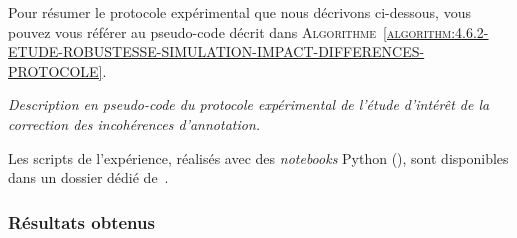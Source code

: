 			Pour résumer le protocole expérimental que nous décrivons ci-dessous, vous pouvez vous référer au pseudo-code décrit dans \textsc{Algorithme~\ref{algorithm:4.6.2-ETUDE-ROBUSTESSE-SIMULATION-IMPACT-DIFFERENCES-PROTOCOLE}}.
			
			\begin{algorithm}
				\caption{\textit{
					Description en pseudo-code du protocole expérimental de l'étude d'intérêt de la correction des incohérences d'annotation.
				}}
				\label{algorithm:4.6.2-ETUDE-ROBUSTESSE-SIMULATION-IMPACT-DIFFERENCES-PROTOCOLE}
			\end{algorithm}
			
			
			\begin{leftBarInformation}
				Les scripts de l'expérience, réalisés avec des \textit{notebooks} Python (\cite{van-rossum-drake:2009:python-reference-manual}), sont disponibles dans un dossier dédié de~\cite{schild:2021:cognitivefactory-interactiveclusteringcomparativestudy}.
			\end{leftBarInformation}

		\subsubsection{Résultats obtenus}
			
